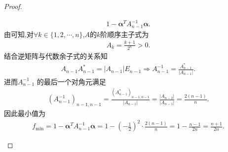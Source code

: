 \documentclass[../../main.tex]{subfiles}%
\begin{document}
\begin{proof}
\begin{enumerate}[(1)]
\begin{align*}
1 - \bm{\alpha}^T A_{n-1}^{-1}\bm{\alpha}.
\end{align*}
由可知,对$\forall k\in \{1,2,\cdots,n\}$,$A$的$k$阶顺序主子式为
\begin{align*}
A_k = \frac{k+1}{2^n}>0.
\end{align*}
结合逆矩阵与代数余子式的关系知
\begin{align*}
A_{n-1}A_{n-1}^{*}=\left| A_{n-1} \right|E_{n-1}\Longrightarrow A_{n-1}^{-1}=\frac{A_{n-1}^{*}}{\left| A_{n-1} \right|}.
\end{align*}
进而$A_{n-1}^{-1}$ 的最后一个对角元满足
\begin{align*}
\left( A_{n-1}^{-1} \right) _{n-1,n-1}=\frac{\left( A_{n-1}^{*} \right) _{n-1,n-1}}{\left| A_{n-1} \right|}=\frac{\left| A_{n-2} \right|}{\left| A_{n-1} \right|}=\frac{2(n-1)}{n}.
\end{align*}
因此最小值为
\begin{align*}
f_{\text{min}} =1 - \bm{\alpha}^T A_{n-1}^{-1}\bm{\alpha}=1-\left( -\frac{1}{2} \right) ^2\cdot \frac{2(n-1)}{n}= 1 - \frac{n-1}{2n} = \frac{n+1}{2n}.
\end{align*}


\end{enumerate}
\end{proof}
\end{document}
